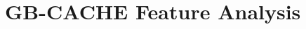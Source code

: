 \documentclass{erauthesis}
\begin{document}


\section{GB-CACHE Feature Analysis} \label{features_gbcache}


\end{document}
